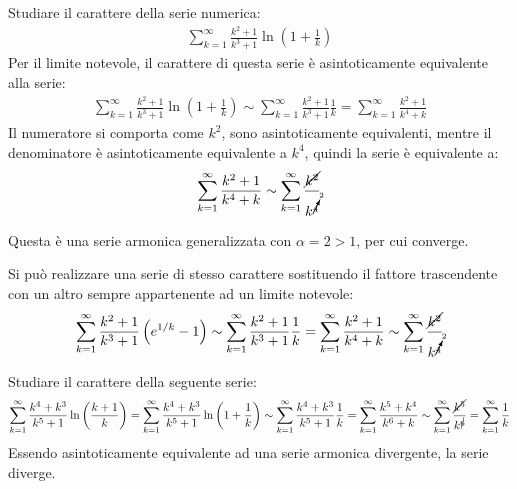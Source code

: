 \documentclass{article}
\numberwithin{equation}{subsection}
\begin{document}

Studiare il carattere della serie numerica:
\begin{gather*}
    \displaystyle\sum_{k=1}^\infty\frac{k^2+1}{k^3+1}\ln\left(1+\frac{1}{k}\right)
\end{gather*}
Per il limite notevole, il carattere di questa serie è asintoticamente equivalente alla serie:
\begin{gather*}
    \displaystyle\sum_{k=1}^\infty\frac{k^2+1}{k^3+1}\ln\left(1+\frac{1}{k}\right)\sim
    \displaystyle\sum_{k=1}^\infty\frac{k^2+1}{k^3+1}\frac{1}{k}=
    \displaystyle\sum_{k=1}^\infty\frac{k^2+1}{k^4+k}
\end{gather*}
Il numeratore si comporta come $k^2$, sono asintoticamente equivalenti, mentre il denominatore è asintoticamente equivalente a $k^4$, quindi la serie è equivalente a:
\begin{gather*}
    \displaystyle\sum_{k=1}^\infty\frac{k^2+1}{k^4+k}\sim
    \displaystyle\sum_{k=1}^\infty\frac{\cancel{k^2}}{k^{\cancelto{2}{4}}}
\end{gather*}

Questa è una serie armonica generalizzata con $\alpha=2>1$, per cui converge. 


Si può realizzare una serie di stesso carattere sostituendo il fattore trascendente con un altro sempre appartenente ad un limite notevole:
\begin{gather*}
    \displaystyle\sum_{k=1}^\infty\frac{k^2+1}{k^3+1}\left(e^{1/k}-1\right)\sim
    \displaystyle\sum_{k=1}^\infty\frac{k^2+1}{k^3+1}\frac{1}{k}=
    \displaystyle\sum_{k=1}^\infty\frac{k^2+1}{k^4+k}\sim
    \displaystyle\sum_{k=1}^\infty\frac{\cancel{k^2}}{k^{\cancelto{2}{4}}}
\end{gather*}



Studiare il carattere della seguente serie:
\begin{gather*}
    \displaystyle\sum_{k=1}^\infty\frac{k^4+k^3}{k^5+1}\ln\left(\frac{k+1}{k}\right)=
    \displaystyle\sum_{k=1}^\infty\frac{k^4+k^3}{k^5+1}\ln\left(1+\frac{1}{k}\right)\sim
    \displaystyle\sum_{k=1}^\infty\frac{k^4+k^3}{k^5+1}\frac{1}{k}=
    \displaystyle\sum_{k=1}^\infty\frac{k^5+k^4}{k^6+k}\sim
    \displaystyle\sum_{k=1}^\infty\frac{\cancel{k^5}}{k^{\cancel{6}}}=
    \displaystyle\sum_{k=1}^\infty\frac{1}{k}
\end{gather*}
Essendo asintoticamente equivalente ad una serie armonica divergente, la serie diverge. 
\end{document}
